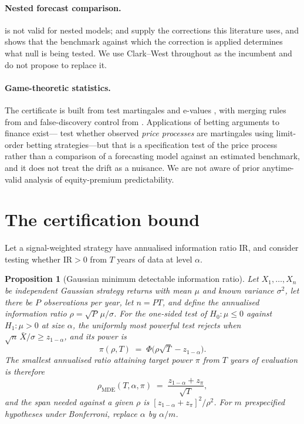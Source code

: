 \documentclass{article}
\theoremstyle{plain}
\newtheorem{proposition}[theorem]{Proposition}
\theoremstyle{definition}
\newcommand{\ir}{\mathrm{IR}}
\begin{document}
\paragraph{Nested forecast comparison.} \citet{diebold1995} is not valid for nested models;
\citet{clark2001} and \citet{clark2006, clark2007} supply the corrections this literature uses,
and \citet{guven2026} shows that the benchmark against which the correction is applied
determines what null is being tested. We use Clark--West throughout as the incumbent and do
not propose to replace it.

\paragraph{Game-theoretic statistics.} The certificate is built from test martingales and
e-values \citep{ville1939, shafer2019, ramdas2023, waudbysmith2024}, with merging rules from
\citet{vovk2021} and false-discovery control from \citet{wang2022}. Applications of betting
arguments to finance exist---\citet{kumon2011} test whether observed \emph{price processes} are
martingales using limit-order betting strategies---but that is a specification test of the
price process rather than a comparison of a forecasting model against an estimated benchmark,
and it does not treat the drift as a nuisance. We are not aware of prior anytime-valid analysis
of equity-premium predictability.

\section{The certification bound}
\label{sec:bound}

Let a signal-weighted strategy have annualised information ratio $\ir$, and consider testing
whether $\ir > 0$ from $T$ years of data at level $\alpha$.

\begin{proposition}[Gaussian minimum detectable information ratio]
\label{prop:floor}
Let $X_1,\dots,X_n$ be independent Gaussian strategy returns with mean $\mu$ and known variance
$\sigma^2$, let there be $P$ observations per year, let $n=PT$, and define the annualised
information ratio $\rho=\sqrt{P}\,\mu/\sigma$. For the one-sided test of $H_0:\mu\le0$ against
$H_1:\mu>0$ at size $\alpha$, the uniformly most powerful test rejects when
$\sqrt{n}\,\bar X/\sigma \ge z_{1-\alpha}$, and its power is
\[
  \pi(\rho,T) \;=\; \Phi\!\big(\rho\sqrt{T}-z_{1-\alpha}\big).
\]
The smallest annualised ratio attaining target power $\pi$ from $T$ years of evaluation is
therefore
\[
  \rho_{\mathrm{MDE}}(T,\alpha,\pi) \;=\; \frac{z_{1-\alpha}+z_\pi}{\sqrt{T}},
\]
and the span needed against a given $\rho$ is $[z_{1-\alpha}+z_\pi]^2/\rho^2$. For $m$
prespecified hypotheses under Bonferroni, replace $\alpha$ by $\alpha/m$.
\end{proposition}
\end{document}
